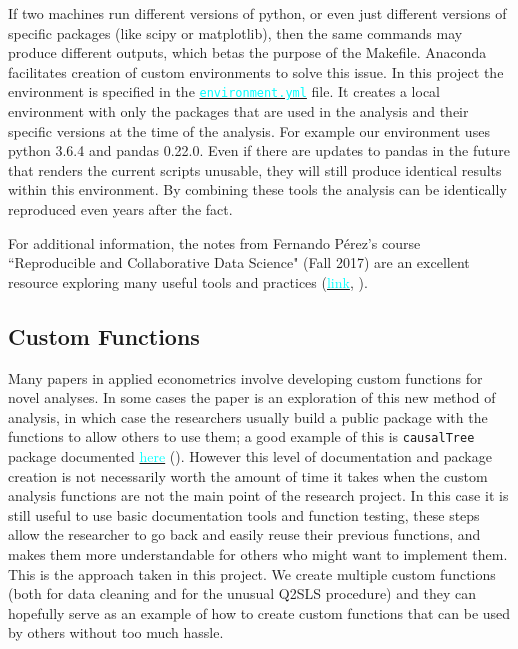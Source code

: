 \documentclass[12pt]{article}
\newcommand{\inlinecode}{\texttt}
\begin{document}
If two machines run different versions of python, or even just different versions of specific packages (like scipy or matplotlib), then the same commands may produce different outputs, which betas the purpose of the Makefile. Anaconda facilitates creation of custom environments to solve this issue. In this project the environment is specified in the \href{https://github.com/nadavtadelis/Reproducible_Metrics/blob/master/environment.yml}{\textcolor{cyan}{\inlinecode{environment.yml}}} file. It creates a local environment with only the packages that are used in the analysis and their specific versions at the time of the analysis. For example our environment uses python 3.6.4 and pandas 0.22.0. Even if there are updates to pandas in the future that renders the current scripts unusable, they will still produce identical results within this environment. By combining these tools the analysis can be identically reproduced even years after the fact.

For additional information, the notes from Fernando P\'erez's course ``Reproducible and Collaborative Data Science" (Fall 2017) are an excellent resource exploring many useful tools and practices (\href{https://berkeley-stat159-f17.github.io/stat159-f17/}{\textcolor{cyan}{link}}, \cite{stat159}).

\subsection{Custom Functions}
Many papers in applied econometrics involve developing custom functions for novel analyses. In some cases the paper is an exploration of this new method of analysis, in which case the researchers usually build a public package with the functions to allow others to use them; a good example of this is \inlinecode{causalTree} package documented \href{https://github.com/susanathey/causalTree}{\textcolor{cyan}{here}} (\cite{causalTree}). However this level of documentation and package creation is not necessarily worth the amount of time it takes when the custom analysis functions are not the main point of the research project. In this case it is still useful to use basic documentation tools and function testing, these steps allow the researcher to go back and easily reuse their previous functions, and makes them more understandable for others who might want to implement them. This is the approach taken in this project. We create multiple custom functions (both for data cleaning and for the unusual Q2SLS procedure) and they can hopefully serve as an example of how to create custom functions that can be used by others without too much hassle. 
\end{document}
